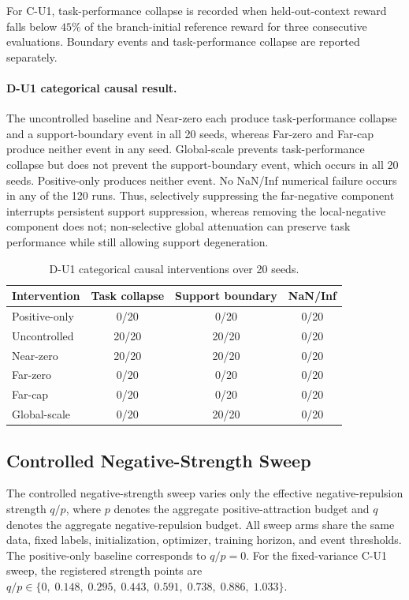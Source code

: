 \documentclass{article}
\theoremstyle{plain}
\theoremstyle{definition}
\theoremstyle{remark}
\begin{document}
For C-U1, task-performance collapse is recorded when held-out-context reward
falls below \(45\%\) of the branch-initial reference reward for three
consecutive evaluations. Boundary events and task-performance collapse are
reported separately.

\paragraph{D-U1 categorical causal result.}
The uncontrolled baseline and Near-zero each produce task-performance
collapse and a support-boundary event in all 20 seeds, whereas Far-zero and
Far-cap produce neither event in any seed. Global-scale prevents
task-performance collapse but does not prevent the support-boundary event,
which occurs in all 20 seeds. Positive-only produces neither event. No NaN/Inf
numerical failure occurs in any of the 120 runs. Thus, selectively suppressing
the far-negative component interrupts persistent support suppression, whereas
removing the local-negative component does not; non-selective global
attenuation can preserve task performance while still allowing support
degeneration.

\begin{table}[t]
\centering
\caption{D-U1 categorical causal interventions over 20 seeds.}
\label{tab:du1_causal_interventions}
\small
\begin{tabular}{lccc}
\toprule
Intervention & Task collapse & Support boundary & NaN/Inf \\
\midrule
Positive-only & 0/20  & 0/20  & 0/20 \\
Uncontrolled  & 20/20 & 20/20 & 0/20 \\
Near-zero     & 20/20 & 20/20 & 0/20 \\
Far-zero      & 0/20  & 0/20  & 0/20 \\
Far-cap       & 0/20  & 0/20  & 0/20 \\
Global-scale  & 0/20  & 20/20 & 0/20 \\
\bottomrule
\end{tabular}
\end{table}

\subsection{Controlled Negative-Strength Sweep}
\label{app:negative_strength_sweep}

The controlled negative-strength sweep varies only the effective
negative-repulsion strength $q/p$, where $p$ denotes the aggregate
positive-attraction budget and $q$ denotes the aggregate
negative-repulsion budget. All sweep arms share the same data, fixed
labels, initialization, optimizer, training horizon, and event
thresholds. The positive-only baseline corresponds to $q/p=0$.
For the fixed-variance C-U1 sweep, the registered strength points are
$q/p\in\{0,\;0.148,\;0.295,\;0.443,\;0.591,\;0.738,\;0.886,\;1.033\}$.
\end{document}
